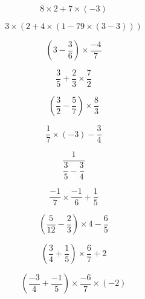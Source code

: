 \begin{multicols}{4}   
  $$8\times 2 +7 \times (-3)$$
    
  $$3\times (2+4\times (1-79\times (3-3)))$$

  $$(3-\dfrac{3}{6}) \times \dfrac{-4}{7} $$

  $$\dfrac{3}{5} + \dfrac{2}{3} \times \dfrac{7}{2}$$
\end{multicols}

\begin{multicols}{4}
  $$(\dfrac{3}{2} - \dfrac{5}{7}) \times \dfrac{8}{3}$$

  $$\dfrac{1}{7} \times(-3) - \dfrac{3}{4}$$
  
  $$\dfrac{1}{\dfrac{3}{5} - \dfrac{3}{4}}$$
    
  $$\dfrac{-1}{7} \times \dfrac{-1}{6} + \dfrac{1}{5}$$
\end{multicols}

\begin{multicols}{3}
  $$(\dfrac{5}{12} - \dfrac{2}{3})\times 4 - \dfrac{6}{5}$$
    
  $$(\dfrac{3}{4} + \dfrac{1}{5}) \times \dfrac{6}{7}+2$$
  
  $$(\dfrac{-3}{4} + \dfrac{-1}{5}) \times \dfrac{-6}{7}\times (-2)$$
\end{multicols}